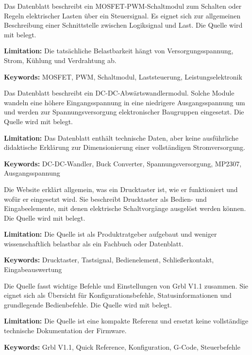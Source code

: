 
{ 
	Das Datenblatt beschreibt ein MOSFET-PWM-Schaltmodul zum Schalten oder Regeln elektrischer Lasten über ein Steuersignal. Es eignet sich zur allgemeinen Beschreibung einer Schnittstelle zwischen Logiksignal und Last. Die Quelle wird mit \cite{JoyITMOSFET:2025} belegt.
	
	\bigskip
	
	\textbf{Limitation:} Die tatsächliche Belastbarkeit hängt von Versorgungsspannung, Strom, Kühlung und Verdrahtung ab.
	
	\scriptsize{\textbf{Keywords:} MOSFET, PWM, Schaltmodul, Laststeuerung, Leistungselektronik}
}



{ 
	Das Datenblatt beschreibt ein DC-DC-Abwärtswandlermodul. Solche Module wandeln eine höhere Eingangsspannung in eine niedrigere Ausgangsspannung um und werden zur Spannungsversorgung elektronischer Baugruppen eingesetzt. Die Quelle wird mit \cite{MP2307:Datasheet} belegt.
	
	\bigskip
	
	\textbf{Limitation:} Das Datenblatt enthält technische Daten, aber keine ausführliche didaktische Erklärung zur Dimensionierung einer vollständigen Stromversorgung.
	
	\scriptsize{\textbf{Keywords:} DC-DC-Wandler, Buck Converter, Spannungsversorgung, MP2307, Ausgangsspannung}
}



{ 
	Die Website erklärt allgemein, was ein Drucktaster ist, wie er funktioniert und wofür er eingesetzt wird. Sie beschreibt Drucktaster als Bedien- und Eingabeelemente, mit denen elektrische Schaltvorgänge ausgelöst werden können. Die Quelle wird mit \cite{RS:2026} belegt.
	
	\bigskip
	
	\textbf{Limitation:} Die Quelle ist als Produktratgeber aufgebaut und weniger wissenschaftlich belastbar als ein Fachbuch oder Datenblatt.
	
	\scriptsize{\textbf{Keywords:} Drucktaster, Tastsignal, Bedienelement, Schließerkontakt, Eingabeauswertung}
}



{ 
	Die Quelle fasst wichtige Befehle und Einstellungen von Grbl V1.1 zusammen. Sie eignet sich als Übersicht für Konfigurationsbefehle, Statusinformationen und grundlegende Bedienbefehle. Die Quelle wird mit \cite{sainsmart:grblquickreference} belegt.
	
	\bigskip
	
	\textbf{Limitation:} Die Quelle ist eine kompakte Referenz und ersetzt keine vollständige technische Dokumentation der Firmware.
	
	\scriptsize{\textbf{Keywords:} Grbl V1.1, Quick Reference, Konfiguration, G-Code, Steuerbefehle}
}


